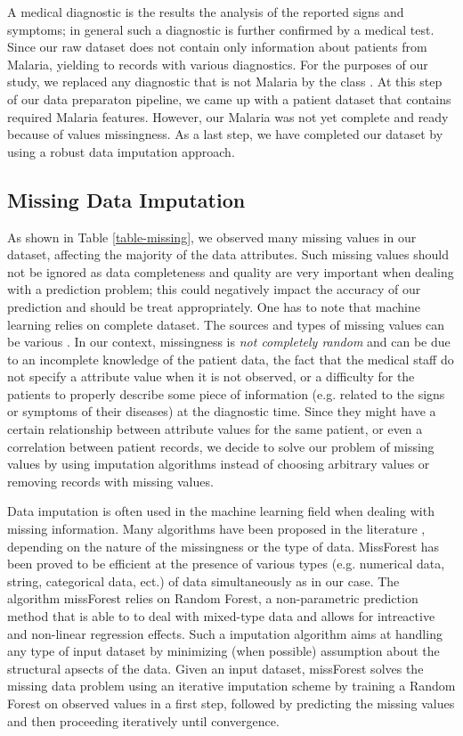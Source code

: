 A medical diagnostic is the results the analysis of the reported signs and symptoms; in general such a diagnostic is further confirmed by a medical test.
Since our raw dataset does not contain only information about patients from Malaria, yielding to records with various diagnostics. For the purposes of 
our study, we replaced any diagnostic that is not Malaria by the class . At this step of our data preparaton pipeline, we came 
up with a patient dataset that contains required Malaria features. However, our Malaria was not yet complete and ready because of values missingness.
As a last step, we have completed our dataset by using a robust data imputation approach.


\subsection{Missing Data Imputation}
As shown in Table \ref{table-missing}, we observed many missing values in our dataset, affecting the majority of the data attributes. Such missing values
should not be ignored as data completeness and quality are very important when dealing with a prediction problem; this could negatively impact the accuracy
of our prediction and should be treat appropriately. One has to note that machine learning relies on complete dataset.
The sources and types of missing values can be various \cite{Al18}. In our context, missingness is \emph{not
completely random} and can be due to an incomplete knowledge of the patient data, the fact that the medical staff do not specify a attribute value when it is
not observed, or a difficulty for the patients to properly describe some piece of information (e.g. related to the signs or symptoms of their diseases) at the
diagnostic time. Since they might have a certain relationship between attribute values for the same patient, or even a correlation between patient records, we 
decide to solve our problem of missing values by using imputation algorithms instead of choosing arbitrary values or removing records with missing values.  

Data imputation is often used in the machine learning field when dealing with missing information. Many algorithms have been proposed in the literature \cite{Si14,Al18},
depending on the nature of the missingness or the type of data. MissForest \cite{Ste12} has been proved to be efficient at the presence of various types (e.g. numerical data,
string, categorical data, ect.) of data simultaneously as in our case.
The algorithm missForest relies on Random Forest, a non-parametric prediction method that is able to to deal with mixed-type data and allows for intreactive and non-linear regression effects.
Such a imputation algorithm aims at handling any type of input dataset by minimizing (when possible) assumption about the structural apsects of the data. Given an input dataset, missForest
solves the missing data problem using an iterative imputation scheme by training a Random Forest on observed values in a first step, followed by predicting the missing values 
and then proceeding iteratively until convergence. 

